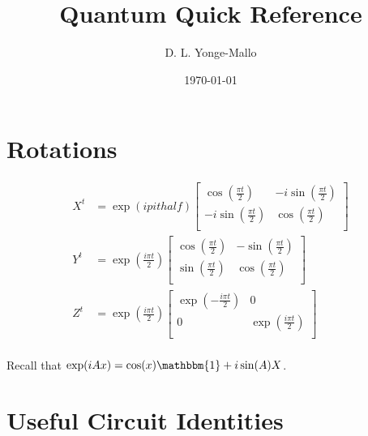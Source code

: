\documentclass[a4paper,landscape,columns=3]{CheatSheet}
\title{Quantum Quick Reference}
\author{D. L. Yonge-Mallo}
\date{\today}
\begin{document}
\newcommand{\pithalf}{\ensuremath{\frac{\pi t}{2}}}
\newcommand{\ipithalf}{\ensuremath{\frac{i\pi t}{2}}}
\newcommand{\one}{\ensuremath{\mathbbm{1}}}

\maketitle

\section{Rotations}

\begin{align*}
X^{t} &= \exp\left(ipithalf\right)
\begin{bmatrix}
\cos\left(\pithalf\right) & -i\sin\left(\pithalf\right) \\
-i\sin\left(\pithalf\right) & \cos\left(\pithalf\right) \\
\end{bmatrix}\\
Y^{t} &= \exp\left(\ipithalf\right)
\begin{bmatrix}
\cos\left(\pithalf\right) & -\sin\left(\pithalf\right) \\
\sin\left(\pithalf\right) & \cos\left(\pithalf\right) \\
\end{bmatrix}\\
Z^{t} &= \exp\left(\ipithalf\right)
\begin{bmatrix}
\exp\left(-\ipithalf\right) & 0 \\
0 & \exp\left(\ipithalf\right) \\
\end{bmatrix}\\
\end{align*}

Recall that \(\exp(iAx) = \cos(x)\one + i\sin(A)X\).



\section{Useful Circuit Identities}
\end{document}
